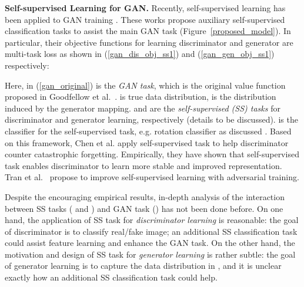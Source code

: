 \documentclass{article}
\begin{document}
{\bf Self-supervised Learning for GAN.}
Recently, self-supervised learning has been applied to GAN training
\cite{chen-arxiv-2018,tran-arxiv-2019}.  These works propose 
auxiliary 
self-supervised classification tasks to assist the main GAN task (Figure~\ref{proposed_model}).
In particular, their objective functions for learning discriminator  and 
generator   are 
multi-task loss as shown in (\ref{gan_dis_obj_ss1}) and (\ref{gan_gen_obj_ss1}) respectively:

\vspace{-0.5cm}

\vspace{-0.5cm}

Here,  in (\ref{gan_original}) is the {\em GAN task}, which is the original value function proposed in Goodfellow et al.~\cite{goodfellow-nisp-2014}.
 is true data distribution,  is the distribution induced by the generator mapping.
 and  are the {\em self-supervised (SS) tasks} for discriminator and generator learning, respectively (details to be discussed).  is the classifier for the self-supervised task, e.g. rotation classifier 
as discussed \cite{gidaris-iclr-2018}.
Based on this framework, Chen et al.\cite{chen-arxiv-2018} apply self-supervised task to help discriminator counter catastrophic forgetting. Empirically, they have shown that self-supervised task enables discriminator to learn more stable and improved representation. Tran et al.~\cite{tran-arxiv-2019} propose to improve self-supervised learning with adversarial training. 

Despite the encouraging empirical results, in-depth analysis of the interaction between SS tasks ( and ) and GAN task () has not been done before.
On one hand, the application of SS task for {\em discriminator learning} is reasonable: the goal of discriminator is to classify real/fake image; an additional SS classification task  could assist feature learning and enhance the GAN task. On the other hand, the motivation and design of SS task for {\em generator learning} is rather subtle: the goal of generator learning is to capture the data distribution in , and it is unclear exactly how an additional SS classification task  could help.
\end{document}

